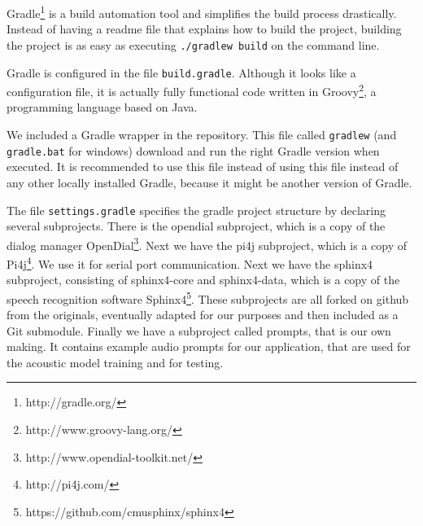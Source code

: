 Gradle\footnote{http://gradle.org/} is a build automation tool and simplifies the build process drastically. 
Instead of having a readme file that explains how to build the project, building the project is as easy as executing \texttt{./gradlew build} on the command line.

Gradle is configured in the file \texttt{build.gradle}. 
Although it looks like a configuration file, it is actually fully functional code written in Groovy\footnote{http://www.groovy-lang.org/}, a programming language based on Java.

We included a Gradle wrapper in the repository.
This file called \texttt{gradlew} (and \texttt{gradle.bat} for windows) download and run the right Gradle version when executed.
It is recommended to use this file instead of using this file instead of any other locally installed Gradle, because it might be another version of Gradle.

The file \texttt{settings.gradle} specifies the gradle project structure by declaring several subprojects. 
There is the opendial subproject, which is a copy of the dialog manager OpenDial\footnote{http://www.opendial-toolkit.net/}.
Next we have the pi4j subproject, which is a copy of Pi4j\footnote{http://pi4j.com/}.
We use it for serial port communication.
Next we have the sphinx4 subproject, consisting of sphinx4-core and sphinx4-data, which is a copy of the speech recognition software Sphinx4\footnote{https://github.com/cmusphinx/sphinx4}.
These subprojects are all forked on github from the originals, eventually adapted for our purposes and then included as a Git submodule.
Finally we have a subproject called prompts, that is our own making. 
It contains example audio prompts for our application, that are used for the acoustic model training and for testing.
